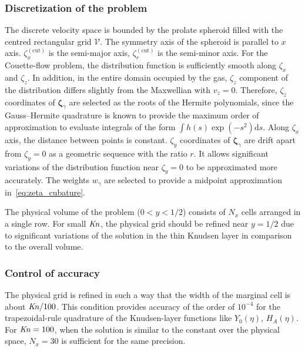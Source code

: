 \documentclass[]{jfm}
\newcommand{\Kn}{\mbox{\textit{Kn}}}
\newcommand{\dd}{\mathrm{d}}
\newcommand{\bzeta}{\boldsymbol{\zeta}}
\begin{document}
\subsubsection{Discretization of the problem}

The discrete velocity space is bounded by the prolate spheroid
filled with the centred rectangular grid \(\mathcal{V}\).
The symmetry axis of the spheroid is parallel to \(x\) axis.
\(\zeta^{(\mathrm{cut})}_x\) is the semi-major axis, \(\zeta^{(\mathrm{cut})}_r\) is the semi-minor axis.
For the Couette-flow problem, the distribution function is sufficiently smooth along \(\zeta_x\) and \(\zeta_z\).
In addition, in the entire domain occupied by the gas, \(\zeta_z\) component of the distribution
differs slightly from the Maxwellian with \(v_z=0\).
Therefore, \(\zeta_z\) coordinates of \(\bzeta_\gamma\) are selected as the roots of the Hermite polynomials,
since the Gauss--Hermite quadrature is known to provide the maximum order of approximation
to evaluate integrals of the form \(\int h(s)\exp(-s^2)\dd{s}\).
Along \(\zeta_x\) axis, the distance between points is constant.
\(\zeta_y\) coordinates of \(\bzeta_\gamma\) are drift apart from \(\zeta_y=0\)
as a geometric sequence with the ratio \(r\).
It allows significant variations of the distribution function near \(\zeta_y=0\) to be approximated more accurately.
The weights \(w_\gamma\) are selected to provide a midpoint approximation in~\eqref{eq:zeta_cubature}.

The physical volume of the problem (\(0<y<1/2\)) consists of \(N_x\) cells arranged in a single row.
For small \(\Kn\), the physical grid should be refined near \(y=1/2\)
due to significant variations of the solution in the thin Knudsen layer in comparison to the overall volume.

\subsubsection{Control of accuracy}

The physical grid is refined in such a way
that the width of the marginal cell is about \(\Kn/100\).
This condition provides accuracy of the order of \(10^{-4}\) for the trapezoidal-rule quadrature
of the Knudsen-layer functions like \(Y_0(\eta)\), \(H_A(\eta)\).
For \(\Kn=100\), when the solution is similar to the constant over the physical space,
\(N_x = 30\) is sufficient for the same precision.
\end{document}
